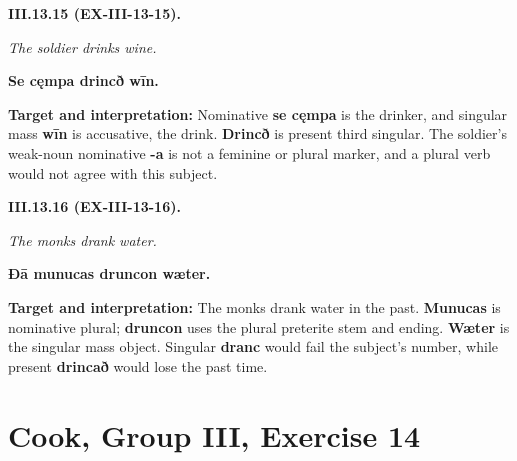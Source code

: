 \par\begin{minipage}{\linewidth}\raggedright
\textbf{III.13.15 (EX-III-13-15).}

\emph{The soldier drinks wine.}

\textbf{Se cęmpa drincð wīn.}

\textbf{Target and interpretation:} Nominative \textbf{se cęmpa} is the drinker, and singular mass \textbf{wīn} is accusative, the drink. \textbf{Drincð} is present third singular. The soldier's weak-noun nominative \textbf{-a} is not a feminine or plural marker, and a plural verb would not agree with this subject.

\end{minipage}\par\addvspace{4pt}

\par\begin{minipage}{\linewidth}\raggedright
\textbf{III.13.16 (EX-III-13-16).}

\emph{The monks drank water.}

\textbf{Ðā munucas druncon wæter.}

\textbf{Target and interpretation:} The monks drank water in the past. \textbf{Munucas} is nominative plural; \textbf{druncon} uses the plural preterite stem and ending. \textbf{Wæter} is the singular mass object. Singular \textbf{dranc} would fail the subject's number, while present \textbf{drincað} would lose the past time.

\end{minipage}\par\addvspace{4pt}

\clearpage
\section*{Cook, Group III, Exercise 14}

